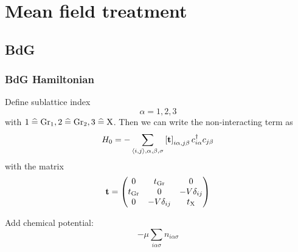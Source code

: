 \documentclass[../main.tex]{subfiles}
\begin{document}
	
\chapter{Mean field treatment}

\section{BdG}

\subsection{BdG Hamiltonian}

Define sublattice index
\begin{equation}
	\alpha = 1, 2, 3
\end{equation}
with \(1 \mathrel{\widehat{=}} \mathrm{Gr}_1, 2 \mathrel{\widehat{=}} \mathrm{Gr}_2, 3 \mathrel{\widehat{=}} \mathrm{X}\).
Then we can write the non-interacting term as
\begin{equation}
	H_0 = - \sum_{\langle i, j \rangle, \alpha, \beta, \sigma} \left[\textbf{t} \right]_{i\alpha,j\beta} c_{i\alpha}^{\dagger} c_{j\beta}
\end{equation}
with the matrix
\begin{equation}
	\textbf{t} = \begin{pmatrix}
		0 & t_{\mathrm{Gr}} & 0 \\
		t_{\mathrm{Gr}} & 0 & -V \delta_{ij} \\
		0 & -V \delta_{ij} & t_{\mathrm{X}} \\
	\end{pmatrix}
\end{equation}

Add chemical potential:
\begin{equation}
	-\mu \sum_{i \alpha \sigma} n_{i \alpha \sigma}
\end{equation}
\end{document}
